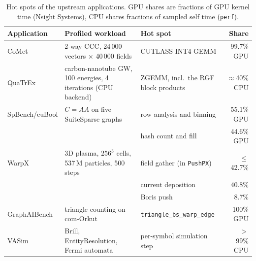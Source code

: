 \begin{table}[t]
  \centering
  \small
  \begin{tabular}{@{}lp{3.5cm}p{3.8cm}r@{}}
    \toprule
    Application & Profiled workload & Hot spot & Share \\
    \midrule
    CoMet          & 2-way CCC, 24\,000 vectors $\times$ 40\,000 fields & CUTLASS INT4 GEMM & 99.7\% GPU \\
    QuaTrEx        & carbon-nanotube GW, 100 energies, 4 iterations (CPU backend) & ZGEMM, incl.\ the RGF block products & $\approx$40\% CPU \\
    SpBench/cuBool & $C = A A$ on five SuiteSparse graphs & row analysis and binning & 55.1\% GPU \\
                   &                                     & hash count and fill     & 44.6\% GPU \\
    WarpX          & 3D plasma, $256^3$ cells, 537\,M particles, 500 steps & field gather (in \texttt{PushPX}) & $\le$42.7\% \\
                   &                                     & current deposition      & 40.8\% \\
                   &                                     & Boris push              & 8.7\% \\
    GraphAIBench   & triangle counting on com-Orkut       & \texttt{triangle\_bs\_warp\_edge} & 100\% GPU \\
    VASim          & Brill, EntityResolution, Fermi automata & per-symbol simulation step & $>$99\% CPU \\
    \bottomrule
  \end{tabular}
  \caption{Hot spots of the upstream applications. GPU shares are fractions of GPU kernel
    time (Nsight Systems), CPU shares fractions of sampled self time (\texttt{perf}).}
  \label{tab:profiles}
\end{table}

